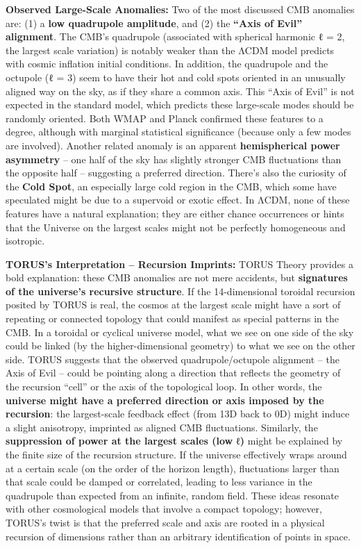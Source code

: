 \documentclass[
]{article}
\begin{document}
\textbf{Observed Large-Scale Anomalies:} Two of the most discussed CMB
anomalies are: (1) a \textbf{low quadrupole amplitude}, and (2) the
\textbf{``Axis of Evil'' alignment}. The CMB's quadrupole (associated
with spherical harmonic ℓ = 2, the largest scale variation) is notably
weaker than the ΛCDM model predicts with cosmic inflation initial
conditions. In addition, the quadrupole and the octupole (ℓ = 3) seem to
have their hot and cold spots oriented in an unusually aligned way on
the sky, as if they share a common axis. This ``Axis of Evil'' is not
expected in the standard model, which predicts these large-scale modes
should be randomly oriented. Both WMAP and Planck confirmed these
features to a degree, although with marginal statistical significance
(because only a few modes are involved). Another related anomaly is an
apparent \textbf{hemispherical power asymmetry} -- one half of the sky
has slightly stronger CMB fluctuations than the opposite half --
suggesting a preferred direction. There's also the curiosity of the
\textbf{Cold Spot}, an especially large cold region in the CMB, which
some have speculated might be due to a supervoid or exotic effect. In
ΛCDM, none of these features have a natural explanation; they are either
chance occurrences or hints that the Universe on the largest scales
might not be perfectly homogeneous and isotropic.

\textbf{TORUS's Interpretation -- Recursion Imprints:} TORUS Theory
provides a bold explanation: these CMB anomalies are not mere accidents,
but \textbf{signatures of the universe's recursive structure}. If the
14-dimensional toroidal recursion posited by TORUS is real, the cosmos
at the largest scale might have a sort of repeating or connected
topology that could manifest as special patterns in the CMB. In a
toroidal or cyclical universe model, what we see on one side of the sky
could be linked (by the higher-dimensional geometry) to what we see on
the other side. TORUS suggests that the observed quadrupole/octupole
alignment -- the Axis of Evil -- could be pointing along a direction
that reflects the geometry of the recursion ``cell'' or the axis of the
topological loop\hspace{0pt}. In other words, the \textbf{universe might
have a preferred direction or axis imposed by the recursion}: the
largest-scale feedback effect (from 13D back to 0D) might induce a
slight anisotropy, imprinted as aligned CMB fluctuations\hspace{0pt}.
Similarly, the \textbf{suppression of power at the largest scales (low
ℓ)} might be explained by the finite size of the recursion structure. If
the universe effectively wraps around at a certain scale (on the order
of the horizon length), fluctuations larger than that scale could be
damped or correlated, leading to less variance in the quadrupole than
expected from an infinite, random field. These ideas resonate with other
cosmological models that involve a compact topology; however, TORUS's
twist is that the preferred scale and axis are rooted in a physical
recursion of dimensions rather than an arbitrary identification of
points in space.
\end{document}
